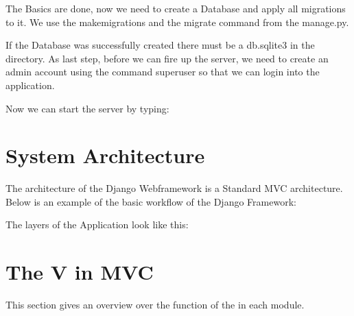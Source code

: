 \documentclass[letterpaper,10pt,english]{sphinxmanual}
\begin{document}
The Basics are done, now we need to create a Database and apply all migrations to it. We use the
makemigrations and the migrate command from the manage.py.
\begin{quote}

\begin{DUlineblock}{0em}
\item[] 
\item[] 
\end{DUlineblock}
\end{quote}

If the Database was successfully created there must be a db.sqlite3 in the directory.
As last step, before we can fire up the server, we need to create an admin account
using the command superuser so that we can login into the application.
\begin{quote}

\end{quote}

Now we can start the server by typing:
\begin{quote}

\end{quote}


\section{System Architecture}
\label{\detokenize{masterDeveloperDoc:system-architecture}}
The architecture of the Django Webframework is a Standard MVC architecture.
Below is an example of the basic workflow of the Django Framework:


The layers of the Application look like this:



\section{The V in MVC}
\label{\detokenize{masterDeveloperDoc:the-v-in-mvc}}
This section gives an overview over the function of the  in each
module.
\end{document}
